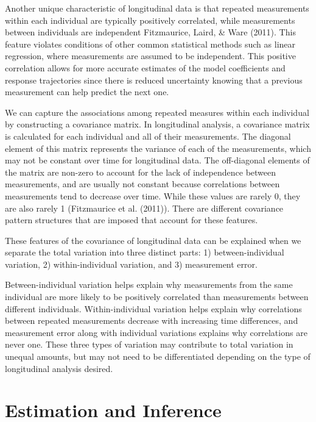 \documentclass[12pt, twoside]{amherstthesis}
\begin{document}
Another unique characteristic of longitudinal data is that repeated measurements within each individual are typically positively correlated, while measurements between individuals are independent Fitzmaurice, Laird, \& Ware (2011). This feature violates conditions of other common statistical methods such as linear regression, where measurements are assumed to be independent. This positive correlation allows for more accurate estimates of the model coefficients and response trajectories since there is reduced uncertainty knowing that a previous measurement can help predict the next one.

We can capture the associations among repeated measures within each individual by constructing a covariance matrix. In longitudinal analysis, a covariance matrix is calculated for each individual and all of their measurements. The diagonal element of this matrix represents the variance of each of the measurements, which may not be constant over time for longitudinal data. The off-diagonal elements of the matrix are non-zero to account for the lack of independence between measurements, and are usually not constant because correlations between measurements tend to decrease over time. While these values are rarely 0, they are also rarely 1 (Fitzmaurice et al. (2011)). There are different covariance pattern structures that are imposed that account for these features.

These features of the covariance of longitudinal data can be explained when we separate the total variation into three distinct parts: 1) between-individual variation, 2) within-individual variation, and 3) measurement error.

Between-individual variation helps explain why measurements from the same individual are more likely to be positively correlated than measurements between different individuals. Within-individual variation helps explain why correlations between repeated measurements decrease with increasing time differences, and measurement error along with individual variations explains why correlations are never one. These three types of variation may contribute to total variation in unequal amounts, but may not need to be differentiated depending on the type of longitudinal analysis desired.

\hypertarget{estimation-and-inference}{%
\section{Estimation and Inference}\label{estimation-and-inference}}
\end{document}
